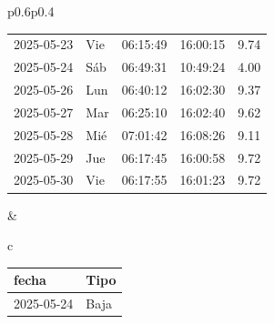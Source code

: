 \documentclass[11pt,a4paper]{article}
\newcommand{\infobox}[2]{
  \begin{tcolorbox}[
    colback=grisclaro,
    colframe=corporativo,
    title=#1,
    fonttitle=\bfseries
  ]
#2
  \end{tcolorbox}
}
\begin{document}
\begin{tabular}{p{}p{}}
{\begin{tabular}{p{2cm} p{0.6cm} p{1.2cm} p{1.2cm} r}
2025-05-23 & Vie & 06:15:49 & 16:00:15 &9.74\\
\rowcolor{white}%
\rowcolor{corporativo!20}
 2025-05-24  &  Sáb  &  06:49:31  &  10:49:24  &%
         4.00\\
\rowcolor{white}%
2025-05-26 & Lun & 06:40:12 & 16:02:30 &9.37\\
\rowcolor{white}%
2025-05-27 & Mar & 06:25:10 & 16:02:40 &9.62\\
\rowcolor{white}%
2025-05-28 & Mié & 07:01:42 & 16:08:26 &9.11\\
\rowcolor{white}%
2025-05-29 & Jue & 06:17:45 & 16:00:58 &9.72\\
\rowcolor{white}%
2025-05-30 & Vie & 06:17:55 & 16:01:23 &9.72\\

\bottomrule
\end{tabular}
}
&
\begin{tabular}{c}

\infobox{D\'ias At\'ipicos}{
\begin{tabular}{p{2cm} p{2cm}}
\toprule
\rowcolor{grisclaro} \textbf{fecha} & \textbf{Tipo}\\
\midrule

2025-05-24 & Baja\\

\bottomrule
\end{tabular}
}
\\
\\




    

    

    

    

    

    

    

    

    

    

    

    

    

    

    


\end{tabular}
\end{tabular}
\end{document}
